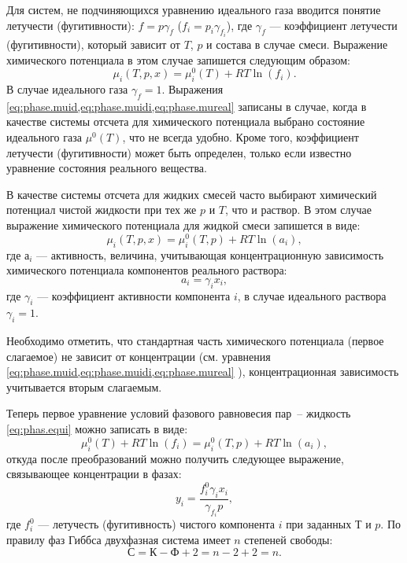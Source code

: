 Для систем, не подчиняющихся уравнению идеального газа вводится понятие летучести (фугитивности): $f=p \gamma_f$ ($f_i=p_i \gamma_{f_i}$), где $\gamma_f$ --- коэффициент летучести (фугитивности), который зависит от $T$, $p$ и состава в случае смеси. Выражение химического потенциала в этом случае запишется следующим образом:
\begin{equation} \label{eq:phase.mureal}
	\mu_i (T,p,x) = \mu_i^0(T) + RT \ln(f_i).
\end{equation}
В случае идеального газа $\gamma_f=1$.
Выражения \cref{eq:phase.muid,eq:phase.muidi,eq:phase.mureal} записаны в случае, когда в качестве системы отсчета для химического потенциала выбрано состояние идеального газа $\mu^0(T)$, что не всегда удобно. Кроме того, коэффициент летучести (фугитивности) может быть определен, только если известно уравнение состояния реального вещества. 

В качестве системы отсчета для жидких смесей часто выбирают химический потенциал чистой жидкости  при тех же $p$ и $T$, что и раствор. В этом случае выражение химического потенциала для жидкой смеси запишется в виде:
\begin{equation}
	\mu_i(T,p,x)=\mu_i^0(T,p)+R T \ln (a_i),
\end{equation}
где $а_i$ --- активность, величина, учитывающая концентрационную зависимость химического потенциала компонентов реального раствора:
\begin{equation}
	a_i=\gamma_i x_i,
\end{equation}
где $\gamma_i$ --- коэффициент активности компонента $i$, в случае идеального раствора $\gamma_i =1 $.

Необходимо отметить, что стандартная часть химического потенциала (первое слагаемое) не зависит от концентрации (см. уравнения \cref{eq:phase.muid,eq:phase.muidi,eq:phase.mureal} ), концентрационная зависимость учитывается вторым слагаемым.

Теперь первое уравнение условий фазового равновесия пар~-- жидкость \eqref{eq:phas.equi} можно записать в виде:
\begin{equation}
	\mu_i^0(T)+RT \ln (f_i)=\mu_i^0(T,p)+ R T \ln (a_i),
\end{equation}
откуда после преобразований можно получить следующее выражение, связывающее концентрации в фазах:
\begin{equation} \label{eq:phase.yreal}
	y_i=\dfrac{f_i^0 \gamma_i x_i}{\gamma_{f_i} p},
\end{equation}
где $f_i^0$ --- летучесть (фугитивность) чистого компонента $i$ при заданных $Т$ и $p$. 
По правилу фаз Гиббса двухфазная система имеет $n$ степеней свободы:
\begin{equation*}
	С=К-Ф+2=n-2+2=n.
\end{equation*}

